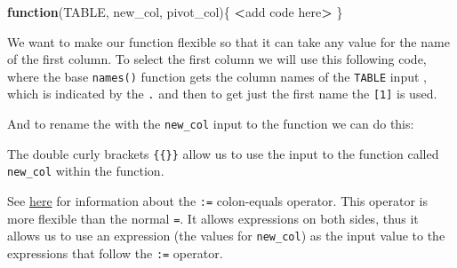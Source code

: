 \documentclass[
]{article}
\newenvironment{Shaded}{\begin{snugshade}}{\end{snugshade}}
\newcommand{\CommentTok}[1]{\textcolor[rgb]{0.56,0.35,0.01}{\textit{#1}}}
\newcommand{\ControlFlowTok}[1]{\textcolor[rgb]{0.13,0.29,0.53}{\textbf{#1}}}
\newcommand{\DecValTok}[1]{\textcolor[rgb]{0.00,0.00,0.81}{#1}}
\newcommand{\ErrorTok}[1]{\textcolor[rgb]{0.64,0.00,0.00}{\textbf{#1}}}
\newcommand{\KeywordTok}[1]{\textcolor[rgb]{0.13,0.29,0.53}{\textbf{#1}}}
\newcommand{\NormalTok}[1]{#1}
\newcommand{\OperatorTok}[1]{\textcolor[rgb]{0.81,0.36,0.00}{\textbf{#1}}}
\newcommand{\StringTok}[1]{\textcolor[rgb]{0.31,0.60,0.02}{#1}}
\begin{document}
\begin{Shaded}
\begin{Highlighting}[]
\ControlFlowTok{function}\NormalTok{(TABLE, new_col, pivot_col)\{}
    \OperatorTok{<}\NormalTok{add code here}\OperatorTok{>}\StringTok{ }
\StringTok{  }\NormalTok{\}}
\end{Highlighting}
\end{Shaded}

We want to make our function flexible so that it can take any value for
the name of the first column. To select the first column we will use
this following code, where the base \texttt{names()} function gets the
column names of the \texttt{TABLE} input , which is indicated by the
\texttt{.} and then to get just the first name the \texttt{{[}1{]}} is
used.

\begin{Shaded}
\end{Shaded}

And to rename the with the \texttt{new\_col} input to the function we
can do this:

\begin{Shaded}
\end{Shaded}

The double curly brackets \texttt{\{\{\}\}} allow us to use the input to
the function called \texttt{new\_col} within the function.

See \href{https://adv-r.hadley.nz/quasiquotation.html\#tidy-dots}{here}
for information about the \texttt{:=} colon-equals operator. This
operator is more flexible than the normal \texttt{=}. It allows
expressions on both sides, thus it allows us to use an expression (the
values for \texttt{new\_col}) as the input value to the expressions that
follow the \texttt{:=} operator.
\end{document}
